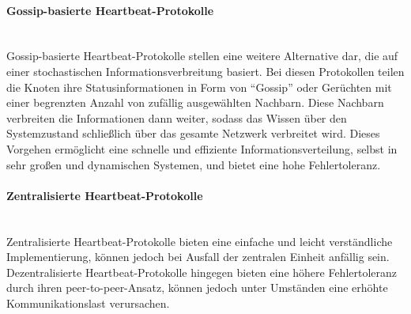 \documentclass[../vs-script-first-v01.tex]{subfiles}
\begin{document}
\paragraph{Gossip-basierte Heartbeat-Protokolle}\mbox{}\\
Gossip-basierte Heartbeat-Protokolle stellen eine weitere Alternative dar, die auf einer stochastischen Informationsverbreitung basiert. Bei diesen Protokollen teilen die Knoten ihre Statusinformationen in Form von \enquote{Gossip} oder Gerüchten mit einer begrenzten Anzahl von zufällig ausgewählten Nachbarn. Diese Nachbarn verbreiten die Informationen dann weiter, sodass das Wissen über den Systemzustand schließlich über das gesamte Netzwerk verbreitet wird. Dieses Vorgehen ermöglicht eine schnelle und effiziente Informationsverteilung, selbst in sehr großen und dynamischen Systemen, und bietet eine hohe Fehlertoleranz.
\paragraph{Zentralisierte Heartbeat-Protokolle}\mbox{}\\
Zentralisierte Heartbeat-Protokolle bieten eine einfache und leicht verständliche Implementierung, können jedoch bei Ausfall der zentralen Einheit anfällig sein. Dezentralisierte Heartbeat-Protokolle hingegen bieten eine höhere Fehlertoleranz durch ihren peer-to-peer-Ansatz, können jedoch unter Umständen eine erhöhte Kommunikationslast verursachen.
\end{document}
